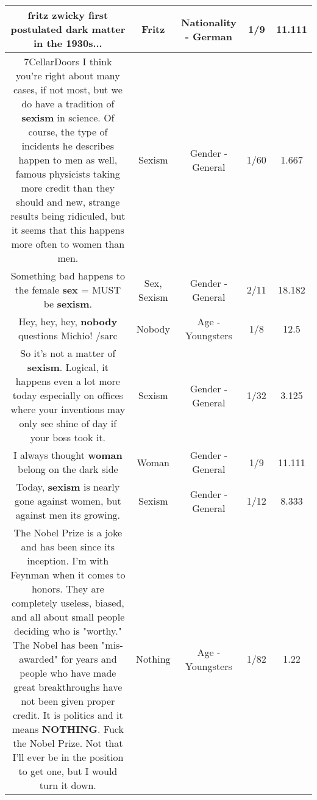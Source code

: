 \documentclass[11pt]{article}
\newlength\mylength
\begin{document}
\begin{center}
\begin{longtable}{|C{.65\mylength}|C{.30\mylength}|C{.12\mylength}|C{.12\mylength}|C{.12\mylength}|}
  \small fritz zwicky first postulated dark matter in the 1930s...\normalsize   & Fritz & Nationality - German & 1/9 & 11.111 \\  \hline
  \small \@7CellarDoors I think you're right about many cases, if not most, but we do have a tradition of \textbf{sexism} in science. Of course, the type of incidents he describes happen to men as well, famous physicists taking more credit than they should and new, strange results being ridiculed, but it seems that this happens more often to women than men.\normalsize   & Sexism & Gender - General & 1/60 & 1.667 \\  \hline
  \small Something bad happens to the female \textbf{sex} = MUST be \textbf{sexism}.\normalsize   & Sex, Sexism & Gender - General & 2/11 & 18.182 \\  \hline
  \small {} Hey, hey, hey, \textbf{nobody} questions Michio! /sarc\normalsize   & Nobody & Age - Youngsters & 1/8 & 12.5 \\  \hline
  \small So it's not a matter of \textbf{sexism}. Logical, it happens even a lot more today especially on offices where your inventions may only see shine of day if your boss took it.\normalsize   & Sexism & Gender - General & 1/32 & 3.125 \\  \hline
  \small I always thought \textbf{woman} belong on the dark side\normalsize   & Woman & Gender - General & 1/9 & 11.111 \\  \hline
  \small Today, \textbf{sexism} is nearly gone against women, but against men its growing.\normalsize   & Sexism & Gender - General & 1/12 & 8.333 \\  \hline
  \small The Nobel Prize is a joke and has been since its inception. I'm with Feynman when it comes to honors. They are completely useless, biased, and all about small people deciding who is "worthy." The Nobel has been "mis-awarded" for years and people who have made great breakthroughs have not been given proper credit. It is politics and it means \textbf{NOTHING}. Fuck the Nobel Prize. Not that I'll ever be in the position to get one, but I would turn it down.\normalsize   & Nothing & Age - Youngsters & 1/82 & 1.22 \\  \hline

\end{longtable}
\end{center}
\end{document}
